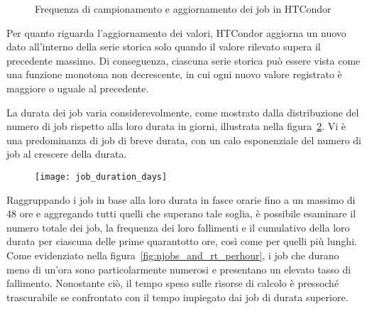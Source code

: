 \begin{figure}[p]
   \centering 
   \caption{\small Frequenza di campionamento e aggiornamento dei job in HTCondor}
   \label{fig:htcondor_sampling}
\end{figure}

Per quanto riguarda l'aggiornamento dei valori, HTCondor aggiorna un nuovo
dato all'interno della serie storica solo quando il valore rilevato supera il
precedente massimo. Di conseguenza, ciascuna serie storica può essere vista
come una funzione monotona non decrescente, in cui ogni nuovo valore
registrato è maggiore o uguale al precedente.

La durata dei job varia considerevolmente, come mostrato dalla distribuzione
del numero di job rispetto alla loro durata in giorni, illustrata nella
figura~\ref{fig:job_duration_days}. Vi è una predominanza di job di breve
durata, con un calo esponenziale del numero di job al crescere della durata.

\begin{figure}[!h]
   \centering
   \texttt{[image: job\_duration\_days]}
   \caption{}
   \label{fig:job_duration_days}
\end{figure}

Raggruppando i job in base alla loro durata in fasce orarie fino a un massimo
di 48 ore e aggregando tutti quelli che superano tale soglia, è possibile
esaminare il numero totale dei job, la frequenza dei loro fallimenti e il
cumulativo della loro durata per ciascuna delle prime quarantotto ore, così
come per quelli più lunghi. Come evidenziato nella
figura~\ref{fig:njobs_and_rt_perhour}, i job che durano meno di un'ora sono
particolarmente numerosi e presentano un elevato tasso di fallimento.
Nonostante ciò, il tempo speso sulle risorse di calcolo è pressoché
trascurabile se confrontato con il tempo impiegato dai job di durata
superiore.

